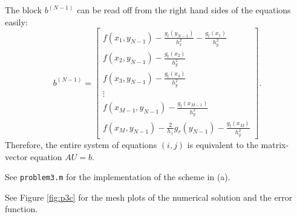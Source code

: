 \documentclass{homework}
\begin{document}
\begin{alphaparts}
\begin{equation*}
		\end{equation*}
		The block $b^{(N-1)}$ can be read off from the right hand sides of the equations easily:
		\begin{equation*}
			b^{(N-1)} = \left[\begin{matrix}
				f(x_1,y_{N-1}) - \frac{g_\ell(y_{N-1})}{h_x^2} - \frac{g_t(x_1)}{h_y^2} \\
				f(x_2,y_{N-1}) - \frac{g_t(x_2)}{h_y^2} \\
				f(x_3,y_{N-1}) - \frac{g_t(x_3)}{h_y^2} \\
				\vdots \\
				f(x_{M-1},y_{N-1}) - \frac{g_t(x_{M-1})}{h_y^2}\\
				f(x_{M},y_{N-1}) - \frac{2}{h_x}g_r(y_{N-1}) - \frac{g_t(x_{M})}{h_y^2}
			\end{matrix}\right].
		\end{equation*}
		Therefore, the entire system of equations $(i,j)$ is equivalent to the matrix-vector equation $AU = b$.
		
		\questionpart See \texttt{problem3.m} for the implementation of the scheme in (a).
		
		
		
		\questionpart See Figure \ref{fig:p3c} for the mesh plots of the numerical solution and the error function.
		

\end{alphaparts}
\end{document}

